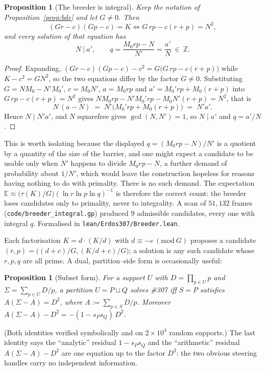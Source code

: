 \documentclass[11pt]{article}
\newtheorem{proposition}[theorem]{Proposition}
\theoremstyle{definition}
\begin{document}
\begin{proposition}[The breeder is integral]\label{prop:bdeint}
Keep the notation of Proposition~\textup{\ref{prop:bde}} and let $G\ne0$. Then
\[ (Gr-c)(Gp-c)=K \iff G\,rp-c(r+p)=N^{2}, \]
and every solution of that equation has
\[ N\ \big|\ a', \qquad q=\frac{M_0rp-N}{N'}=\frac{a'}{N}\ \in\ \mathbb{Z}. \]
\end{proposition}
\begin{proof}
Expanding, $(Gr-c)(Gp-c)-c^{2}=G\bigl(G\,rp-c(r+p)\bigr)$ while $K-c^{2}=GN^{2}$, so the two
equations differ by the factor $G\ne0$. Substituting $G=NM_0-N'M_0'$, $c=M_0N'$, $a=M_0rp$ and
$a'=M_0'rp+M_0(r+p)$ into $G\,rp-c(r+p)=N^{2}$ gives
$NM_0rp-N'M_0'rp-M_0N'(r+p)=N^{2}$, that is
\[ N\,(a-N)\;=\;N'\bigl(M_0'rp+M_0(r+p)\bigr)\;=\;N'a'. \]
Hence $N\mid N'a'$, and $N$ squarefree gives $\gcd(N,N')=1$, so $N\mid a'$ and $q=a'/N$.
\end{proof}

This is worth isolating because the displayed $q=(M_0rp-N)/N'$ is a quotient by a quantity of the
size of the barrier, and one might expect a candidate to be usable only when $N'$ happens to divide
$M_0rp-N$, a further demand of probability about $1/N'$, which would leave the construction
hopeless for reasons having nothing to do with primality. There is no such demand. The expectation
$\mathbb{E}\approx\bigl(\tau(K)/G\bigr)(\ln r\ln p\ln q)^{-1}$ is therefore the correct count: the
breeder loses candidates only to primality, never to integrality. A scan of $51{,}132$ frames
(\texttt{code/breeder\_integral.gp}) produced $9$ admissible candidates, every one with integral $q$.
Formalised in \texttt{lean/Erdos307/Breeder.lean}.

Each factorisation $K=d\cdot(K/d)$ with $d\equiv-c\ (\mathrm{mod}\ G)$ proposes a candidate
$(r,p)=\bigl((d+c)/G,(K/d+c)/G\bigr)$; a solution is any such candidate whose $r,p,q$ are all prime.
A dual, partition--side form is occasionally useful:

\begin{proposition}[Subset form]\label{prop:subset}
For a support $U$ with $D=\prod_{p\in U}p$ and $\Sigma=\sum_{p\in U}D/p$, a partition $U=P\sqcup Q$
solves \#307 iff $S=P$ satisfies $A(\Sigma-A)=D^2$, where $A:=\sum_{p\in S}D/p$. Moreover
$A(\Sigma-A)-D^2=-(1-s_Ps_Q)\,D^2$.
\end{proposition}

(Both identities verified symbolically and on $2\times10^4$ random supports.) The last identity says
the ``analytic'' residual $1-s_Ps_Q$ and the ``arithmetic'' residual $A(\Sigma-A)-D^2$ are one
equation up to the factor $D^2$: the two obvious steering handles carry no independent information.
\end{document}
